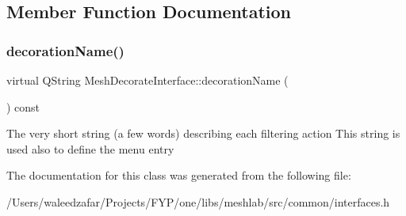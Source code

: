\subsection{Member Function Documentation}
\mbox{\label{class_mesh_decorate_interface_aed4eb195ecbf0f7e35dae555c8e6d1e7}} 
\subsubsection{\texorpdfstring{decoration\+Name()}{decorationName()}}
{\footnotesize\ttfamily virtual Q\+String Mesh\+Decorate\+Interface\+::decoration\+Name (\begin{DoxyParamCaption}\item[{Filter\+I\+D\+Type}]{ }\end{DoxyParamCaption}) const\hspace{0.3cm}{\ttfamily [pure virtual]}}

The very short string (a few words) describing each filtering action This string is used also to define the menu entry 

The documentation for this class was generated from the following file\+:\begin{DoxyCompactItemize}
\item 
/\+Users/waleedzafar/\+Projects/\+F\+Y\+P/one/libs/meshlab/src/common/interfaces.\+h\end{DoxyCompactItemize}
